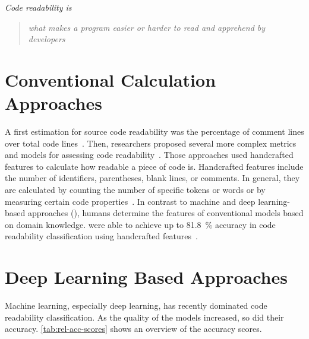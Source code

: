 \documentclass[%
class=scrreprt,
chapterprefix=false,%
open=right,%
twoside=true,%
paper=a4,%
logofile={Logo\_zentral\_farbig\_EN.png},%
thesistype=master,%
UKenglish,%
]{se2thesis}
\theoremstyle{definition}
\newcommand{\citeclassicmodels}{\cite{buse2009learning, posnett2011simpler, dorn2012general, scalabrino2018comprehensive}\xspace}
\newcommand{\citedeepmodels}{\cite{mi2018inception, mi2018improving, sharma2020egan, mi2022towards, mi2022rank, mi2023graph}\xspace}
\begin{document}
	\textit{Code readability is} \blockcquote{oliveira2020evaluating}{\textit{what makes a program easier or harder to read and apprehend by developers}}.

	
\section{Conventional Calculation Approaches} \label{Conventional Calculation Approaches}
	A first estimation for source code readability was the percentage of comment lines over total code lines~\cite{aggarwal2002integrated}. Then, researchers proposed several more complex metrics and models for assessing code readability~\cite{buse2009learning, posnett2011simpler, dorn2012general, scalabrino2018comprehensive}.
	Those approaches used handcrafted features to calculate how readable a piece of code is.
	Handcrafted features include the number of identifiers, parentheses, blank lines, or comments. In general, they are calculated by counting the number of specific tokens or words or by measuring certain code properties~\cite{scalabrino2018comprehensive}.
	In contrast to machine and deep learning-based approaches (), humans determine the features of conventional models based on domain knowledge.
	\citeauthor{scalabrino2018comprehensive} were able to achieve up to 81.8~\% accuracy in code readability classification using handcrafted features~\cite{scalabrino2018comprehensive}.
	
\section{Deep Learning Based Approaches} \label{Deep Learning Based Approaches}
	Machine learning, especially deep learning, has recently dominated code readability classification. As the quality of the models increased, so did their accuracy. \autoref{tab:rel-acc-scores} shows an overview of the accuracy scores.
	
\end{document}
